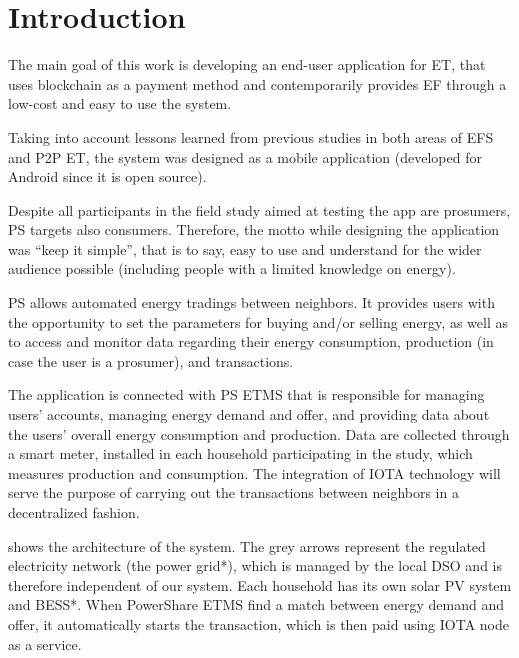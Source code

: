 \cleardoublepage
\label{chap:implement}
\section{Introduction} 

The main goal of this work is developing an end-user application for \ac{ET}, that uses blockchain as a payment method and contemporarily provides \ac{EF} through a low-cost and easy to use the system.


Taking into account lessons learned from previous studies in both areas of \ac{EFS} and \ac{P2P} \ac{ET}, the system was designed as a mobile application (developed for Android since it is open source).



Despite all participants in the field study aimed at testing the app are prosumers, \ac{PS} targets also consumers. Therefore, the motto while designing the application was “keep it simple”, that is to say, easy to use and understand for the wider audience possible (including people with a limited knowledge on energy).



\ac{PS} allows automated energy tradings between neighbors. It provides users with the opportunity to set the parameters for buying and/or selling energy, as well as to access and monitor data regarding their energy consumption, production (in case the user is a prosumer), and transactions.



The application is connected with \ac{PS} \ac{ETMS} that is responsible for managing users’ accounts, managing energy demand and offer, and providing data about the users’ overall energy consumption and production. Data are collected through a smart meter, installed in each household participating in the study, which measures production and consumption. The integration of IOTA technology will serve the purpose of carrying out the transactions between neighbors in a decentralized fashion.


 shows the architecture of the system. The grey arrows represent the regulated electricity network (the power grid*), which is managed by the local \ac{DSO} and is therefore independent of our system. Each household has its own solar PV system and BESS*. When PowerShare \ac{ETMS} find a match between energy demand and offer, it automatically starts the transaction, which is then paid using IOTA node as a service.  

